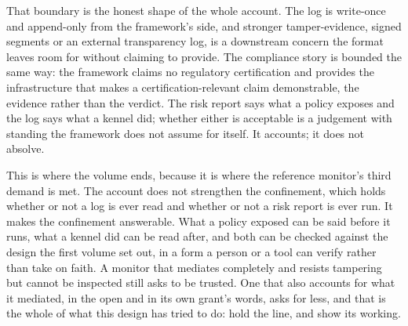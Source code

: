 That boundary is the honest shape of the whole account. The log is
write-once and append-only from the framework's side, and stronger
tamper-evidence, signed segments or an external transparency log, is a
downstream concern the format leaves room for without claiming to
provide. The compliance story is bounded the same way: the framework
claims no regulatory certification and provides the infrastructure that
makes a certification-relevant claim demonstrable, the evidence rather
than the verdict. The risk report says what a policy exposes and the log
says what a kennel did; whether either is acceptable is a judgement with
standing the framework does not assume for itself. It accounts; it does
not absolve.

This is where the volume ends, because it is where the reference
monitor's third demand is met. The account does not strengthen the
confinement, which holds whether or not a log is ever read and whether
or not a risk report is ever run. It makes the confinement answerable.
What a policy exposed can be said before it runs, what a kennel did can
be read after, and both can be checked against the design the first
volume set out, in a form a person or a tool can verify rather than take
on faith. A monitor that mediates completely and resists tampering but
cannot be inspected still asks to be trusted. One that also accounts for
what it mediated, in the open and in its own grant's words, asks for
less, and that is the whole of what this design has tried to do: hold
the line, and show its working.
